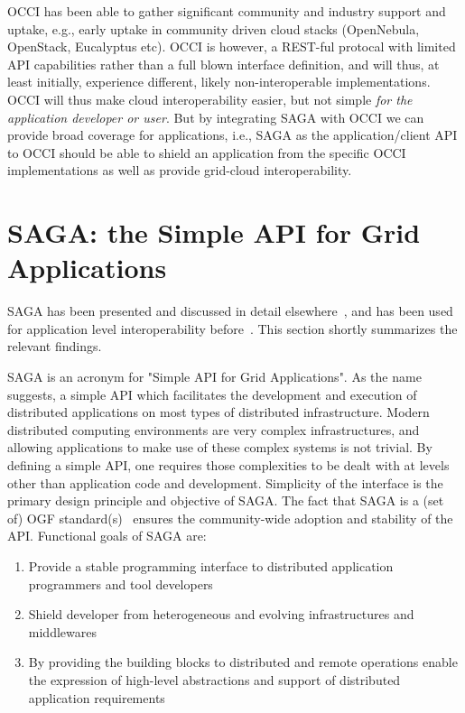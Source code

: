 \documentclass[10pt,conference,final,letterpaper,twoside,twocolumn,]{IEEEtran}
\begin{document}

 OCCI has been able to gather significant community and industry
 support and uptake, e.g., early uptake in community driven cloud
 stacks (OpenNebula, OpenStack, Eucalyptus etc).  OCCI is however, a
 REST-ful protocal with limited API capabilities rather than a full
 blown interface definition, and will thus, at least initially,
 experience different, likely non-interoperable implementations. OCCI
 will thus make cloud interoperability easier, but not simple {\it for
   the application developer or user}.  But by integrating SAGA with
 OCCI we can provide broad coverage for applications, i.e., SAGA as
 the application/client API to OCCI should be able to shield an
 application from the specific OCCI implementations as well as provide
 grid-cloud interoperability.

\section{SAGA: the Simple API for Grid Applications}
\label{sec:saga}

 SAGA has been presented and discussed in detail
 elsewhere~\cite{sagapub...}, and has been used for application level
 interoperability before~\cite{sagainterop...}.  This section shortly
 summarizes the relevant findings.

 SAGA is an acronym for "Simple API for Grid Applications". As the
 name suggests, a simple API which facilitates the development and
 execution of distributed applications on most types of distributed
 infrastructure.  Modern distributed computing environments are very
 complex infrastructures, and allowing applications to make use of
 these complex systems is not trivial.  By defining a simple API, one
 requires those complexities to be dealt with at levels other than
 application code and development.  Simplicity of the interface is the
 primary design principle and objective of SAGA.  The fact that SAGA
 is a (set of) OGF standard(s)~\cite{sagaspecs...} ensures the
 community-wide adoption and stability of the API.  Functional goals
 of SAGA are:

 \begin{enumerate}

  \item Provide a stable programming interface to distributed
  application programmers and tool developers
 
  \item Shield developer from heterogeneous and evolving
  infrastructures and middlewares

  \item By providing the building blocks to distributed and remote
  operations enable the expression of high-level abstractions and
  support of distributed application requirements

 \end{enumerate}
\end{document}
